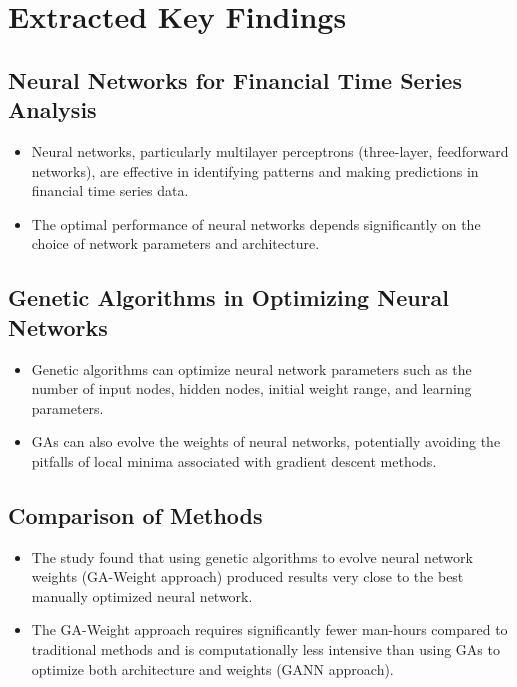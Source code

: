 \documentclass[12pt]{article}
\begin{document}
\section{Extracted Key Findings}

\subsection{Neural Networks for Financial Time Series Analysis}
\begin{itemize}
    \item Neural networks, particularly multilayer perceptrons (three-layer, feedforward networks), are effective in identifying patterns and making predictions in financial time series data.
    \item The optimal performance of neural networks depends significantly on the choice of network parameters and architecture.
\end{itemize}

\subsection{Genetic Algorithms in Optimizing Neural Networks}
\begin{itemize}
    \item Genetic algorithms can optimize neural network parameters such as the number of input nodes, hidden nodes, initial weight range, and learning parameters.
    \item GAs can also evolve the weights of neural networks, potentially avoiding the pitfalls of local minima associated with gradient descent methods.
\end{itemize}

\subsection{Comparison of Methods}
\begin{itemize}
    \item The study found that using genetic algorithms to evolve neural network weights (GA-Weight approach) produced results very close to the best manually optimized neural network.
    \item The GA-Weight approach requires significantly fewer man-hours compared to traditional methods and is computationally less intensive than using GAs to optimize both architecture and weights (GANN approach).
\end{itemize}
\end{document}
